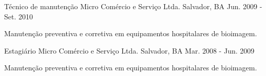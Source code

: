 \begin{cventries}
    
  \cventry
    {Técnico de manutenção} %
    {Micro Comércio e Serviço Ltda.} %
    {Salvador, BA} %
    {Jun. 2009 - Set. 2010} %
    {
      \begin{cvitems} %
        \item {Manutenção preventiva e corretiva em equipamentos hospitalares de bioimagem.}
      \end{cvitems}
    }

  \cventry
    {Estagiário} %
    {Micro Comércio e Serviço Ltda.} %
    {Salvador, BA} %
    {Mar. 2008 - Jun. 2009} %
    {
      \begin{cvitems} %
        \item {Manutenção preventiva e corretiva em equipamentos hospitalares de bioimagem.}
      \end{cvitems}
    }


\end{cventries}
